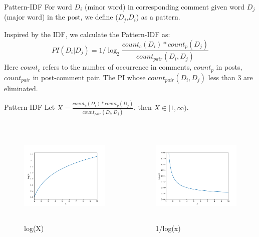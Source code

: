 \documentclass[aspectratio=169]{beamer}
\begin{document}
    \begin{frame}{Pattern-IDF}
      For word $D_i$ (minor word) in corresponding comment given word $D_j$ (major word) in the post, we define ($D_j$,$D_i$) as a pattern.

      Inspired by the IDF, we calculate the Pattern-IDF as:
      \begin{equation}
        PI(D_i|D_j) = 1 / \log_2{\frac{count_c(D_i) * count_p(D_j)}{count_{pair}(D_i, D_j)}}
      \end{equation}
      Here $count_c$ refers to the number of occurrence in comments, $count_p$ in posts, $count_{pair}$ in post-comment pair. The PI whose $count_{pair}(D_i, D_j)$ less than 3 are eliminated.

    \end{frame}

    \begin{frame}{Pattern-IDF}
      Let $X = \frac{count_c(D_i) * count_p(D_j)}{count_{pair}(D_i, D_j)}$, then $X \in [1, \infty)$.
      \begin{columns}[T] %
      \begin{column}{.48\textwidth}
      
      \begin{figure}
      \includegraphics[width=6.4cm,height=4.8cm]{pi1.png}
      \caption{log(X)}
      \end{figure}
      
      \end{column}%
      \hfill%
      \begin{column}{.48\textwidth}
      
        \begin{figure}
        \includegraphics[width=6.4cm,height=4.8cm]{pi2.png}
        \caption{1/log(x)}
        \end{figure}

      \end{column}%
      \end{columns}
    \end{frame}
\end{document}
